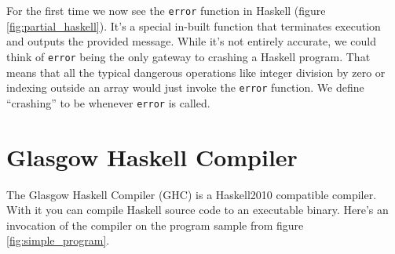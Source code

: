 \begin{figure}
\end{figure}

For the first time we now see the \texttt{error} function in Haskell (figure \ref{fig:partial_haskell}).  It's a
special in-built function that terminates execution and outputs the provided
message. While it's not entirely accurate, we could think of \texttt{error}
being the only gateway to crashing a Haskell program. That means that all the
typical dangerous operations like integer division by zero or indexing outside
an array would just invoke the \texttt{error} function. We define ``crashing''
to be whenever \texttt{error} is called.



\section{Glasgow Haskell Compiler}

The Glasgow Haskell Compiler (GHC) is a Haskell2010 compatible compiler.
\cite{ghc_website} With it you can compile Haskell source code to an executable
binary. Here's an invocation of the compiler on the program sample from figure \ref{fig:simple_program}.

